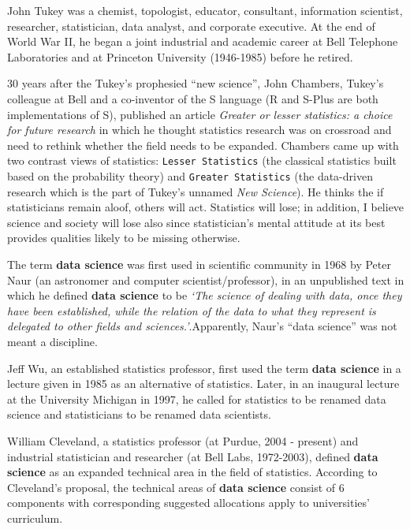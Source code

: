 \documentclass[
]{book}
\begin{document}
John Tukey was a chemist, topologist, educator, consultant, information scientist, researcher, statistician, data analyst, and corporate executive. At the end of World War II, he began a joint industrial and academic career at Bell Telephone Laboratories and at Princeton University (1946-1985) before he retired.

30 years after the Tukey's prophesied ``new science'', John Chambers, Tukey's colleague at Bell and a co-inventor of the S language (R and S-Plus are both implementations of S), published an article \emph{Greater or lesser statistics: a choice for future research} in which he thought statistics research was on crossroad and need to rethink whether the field needs to be expanded. Chambers came up with two contrast views of statistics: \texttt{Lesser\ Statistics} (the classical statistics built based on the probability theory) and \texttt{Greater\ Statistics} (the data-driven research which is the part of Tukey's unnamed \emph{New Science}). He thinks the if statisticians remain aloof, others will act. Statistics will lose; in addition, I believe science and society will lose also since statistician's mental attitude at its best provides qualities likely to be missing otherwise.

The term \textbf{data science} was first used in scientific community in 1968 by Peter Naur (an astronomer and computer scientist/professor), in an unpublished text in which he defined \textbf{data science} to be \emph{`The science of dealing with data, once they have been established, while the relation of the data to what they represent is delegated to other fields and sciences.'}.Apparently, Naur's ``data science'' was not meant a discipline.

Jeff Wu, an established statistics professor, first used the term \textbf{data science} in a lecture given in 1985 as an alternative of statistics. Later, in an inaugural lecture at the University Michigan in 1997, he called for statistics to be renamed data science and statisticians to be renamed data scientists.

William Cleveland, a statistics professor (at Purdue, 2004 - present) and industrial statistician and researcher (at Bell Labs, 1972-2003), defined \textbf{data science} as an expanded technical area in the field of statistics. According to Cleveland's proposal, the technical areas of \textbf{data science} consist of 6 components with corresponding suggested allocations apply to universities' curriculum.
\end{document}
